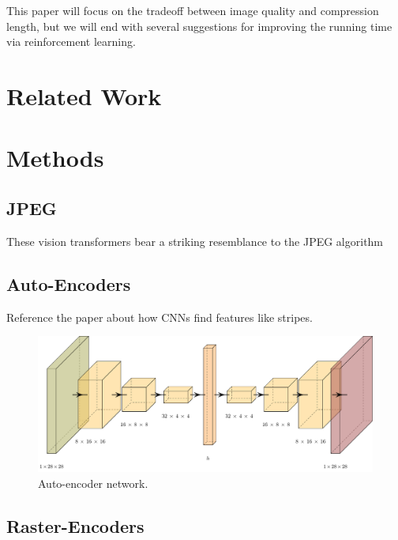 \documentclass[11pt]{article}
\begin{document}
This paper will focus on the tradeoff between image quality and compression length, but we will end with several suggestions for improving the running time via reinforcement learning.


\section{Related Work}

\section{Methods}

\subsection{JPEG}\label{sec:jpeg}

These vision transformers bear a striking resemblance to the JPEG algorithm

\subsection{Auto-Encoders}

Reference the paper about how CNNs find features like stripes.

\begin{figure}[t]
  \centering
  \includegraphics[width=2\columnwidth]{diagrams/auto.pdf}
  \caption{Auto-encoder network.}
  \label{fig:auto}
\end{figure}

\subsection{Raster-Encoders}
\end{document}
